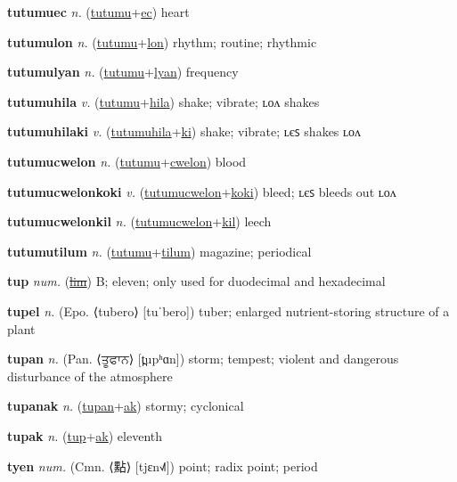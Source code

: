 \textbf{\hypertarget{tutumuec}{tutumuec}} \textit{n.} (\hyperlink{tutumu}{tutumu}+\allowbreak \hyperlink{ec}{ec})
heart

\textbf{\hypertarget{tutumulon}{tutumulon}} \textit{n.} (\hyperlink{tutumu}{tutumu}+\allowbreak \hyperlink{lon}{lon})
rhythm; routine; rhythmic

\textbf{\hypertarget{tutumulyan}{tutumulyan}} \textit{n.} (\hyperlink{tutumu}{tutumu}+\allowbreak \hyperlink{lyan}{lyan})
frequency

\textbf{\hypertarget{tutumuhila}{tutumuhila}} \textit{v.} (\hyperlink{tutumu}{tutumu}+\allowbreak \hyperlink{hila}{hila})
shake; vibrate; ʟᴏᴧ shakes

\textbf{\hypertarget{tutumuhilaki}{tutumuhilaki}} \textit{v.} (\hyperlink{tutumuhila}{tutumuhila}+\allowbreak \hyperlink{ki}{ki})
shake; vibrate; ʟєꜱ shakes ʟᴏᴧ

\textbf{\hypertarget{tutumucwelon}{tutumucwelon}} \textit{n.} (\hyperlink{tutumu}{tutumu}+\allowbreak \hyperlink{cwelon}{cwelon})
blood

\textbf{\hypertarget{tutumucwelonkoki}{tutumucwelonkoki}} \textit{v.} (\hyperlink{tutumucwelon}{tutumucwelon}+\allowbreak \hyperlink{koki}{koki})
bleed; ʟєꜱ bleeds out ʟᴏᴧ

\textbf{\hypertarget{tutumucwelonkil}{tutumucwelonkil}} \textit{n.} (\hyperlink{tutumucwelon}{tutumucwelon}+\allowbreak \hyperlink{kil}{kil})
leech

\textbf{\hypertarget{tutumutilum}{tutumutilum}} \textit{n.} (\hyperlink{tutumu}{tutumu}+\allowbreak \hyperlink{tilum}{tilum})
magazine; periodical

\textbf{\hypertarget{tup}{tup}} \textit{num.} (\hyperlink{lim}{\sout{lim}})
B; eleven; only used for duodecimal and hexadecimal

\textbf{\hypertarget{tupel}{tupel}} \textit{n.} (Epo. ⟨tubero⟩ [tuˈbero])
tuber; enlarged nutrient-storing structure of a plant

\textbf{\hypertarget{tupan}{tupan}} \textit{n.} (Pan. ⟨{\gurmukhi{}ਤੂਫਾਨ}⟩ [t̪upʰɑn])
storm; tempest; violent and dangerous disturbance of the atmosphere

\textbf{\hypertarget{tupanak}{tupanak}} \textit{n.} (\hyperlink{tupan}{tupan}+\allowbreak \hyperlink{ak}{ak})
stormy; cyclonical

\textbf{\hypertarget{tupak}{tupak}} \textit{n.} (\hyperlink{tup}{tup}+\allowbreak \hyperlink{ak}{ak})
eleventh

\textbf{\hypertarget{tyen}{tyen}} \textit{num.} (Cmn. ⟨{\chinese{}點}⟩ [tjɛn˧˩˥])
point; radix point; period

